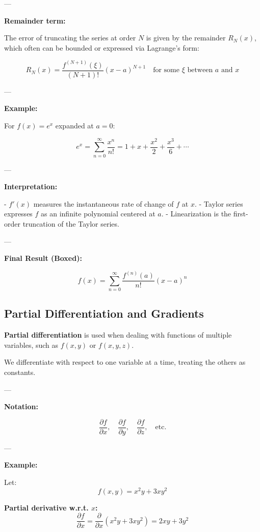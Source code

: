 ---

\textbf{Remainder term:}

The error of truncating the series at order \( N \) is given by the remainder \( R_N(x) \), which often can be bounded or expressed via Lagrange’s form:

\[
R_N(x) = \frac{f^{(N+1)}(\xi)}{(N+1)!} (x - a)^{N+1} \quad \text{for some } \xi \text{ between } a \text{ and } x
\]

---

\textbf{Example:}

For \( f(x) = e^x \) expanded at \( a = 0 \):

\[
e^x = \sum_{n=0}^{\infty} \frac{x^n}{n!} = 1 + x + \frac{x^2}{2} + \frac{x^3}{6} + \cdots
\]

---

\textbf{Interpretation:}

- \( f'(x) \) measures the instantaneous rate of change of \( f \) at \( x \).
- Taylor series expresses \( f \) as an infinite polynomial centered at \( a \).
- Linearization is the first-order truncation of the Taylor series.

---

\textbf{Final Result (Boxed):}

\[
\boxed{
f(x) = \sum_{n=0}^\infty \frac{f^{(n)}(a)}{n!} (x - a)^n
}
\]






\subsection{Partial Differentiation and Gradients}

\textbf{Partial differentiation} is used when dealing with functions of multiple variables, such as \( f(x, y) \) or \( f(x, y, z) \).

We differentiate with respect to one variable at a time, treating the others as constants.

---

\textbf{Notation:}

\[
\frac{\partial f}{\partial x}, \quad \frac{\partial f}{\partial y}, \quad \frac{\partial f}{\partial z}, \quad \text{etc.}
\]

---

\textbf{Example:}

Let:
\[
f(x, y) = x^2y + 3xy^2
\]

\textbf{Partial derivative w.r.t. \(x\):}
\[
\frac{\partial f}{\partial x} = \frac{\partial}{\partial x}(x^2y + 3xy^2) = 2xy + 3y^2
\]

